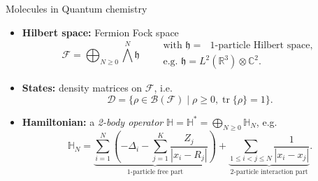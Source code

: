 \documentclass{beamer}
\DeclareMathOperator{\tr}{tr}
\newcommand{\IR}{\ensuremath{\mathbb{R}}}
\newcommand{\IC}{\ensuremath{\mathbb{C}}}
\newcommand{\HilbertSpace}{\ensuremath{\mathfrak{h}}}
\newcommand{\FockSpace}{\mathcal{F}}
\newcommand{\Hamiltonian}{\mathbb{H}}
\newcommand{\DensityMatrices}{\mathcal{D}}
\begin{document}
\begin{frame}{Molecules in Quantum chemistry}
    \begin{itemize}
        \item<1-> \textbf{Hilbert space:} Fermion Fock space
        \begin{equation}
            \mathcal{F}=\bigoplus_{N\ge 0}\bigwedge^N\HilbertSpace\qquad
            \begin{gathered}
                \text{with }\HilbertSpace=\text{ $1$-particle Hilbert space},\\
                \text{e.g. }\HilbertSpace=L^2(\IR^3)\otimes\IC^2.
            \end{gathered}
        \end{equation}
        \item<2-> \textbf{States:} density matrices on $\FockSpace$, i.e.
        \begin{equation}
            \DensityMatrices=\{\rho\in\mathcal{B}(\FockSpace)\mid \rho\ge 0, \tr\{\rho\}=1\}.
        \end{equation}
        \item<3-> \textbf{Hamiltonian:} a \emph{2-body operator} $\Hamiltonian=\Hamiltonian^*=\bigoplus_{N\ge 0}\Hamiltonian_N$, e.g.
        \begin{equation}
            \Hamiltonian_N=
            \underbrace{\sum_{i=1}^N\left(-\Delta_i-\sum_{j=1}^K\frac{Z_j}{|x_i-R_j|}\right)}_{\text{1-particle free part}}
            +\underbrace{\sum_{1\le i<j\le N}\frac{1}{|x_i-x_j|}}_{\text{2-particle interaction part}}.
        \end{equation}
    \end{itemize}
\end{frame}
\end{document}
